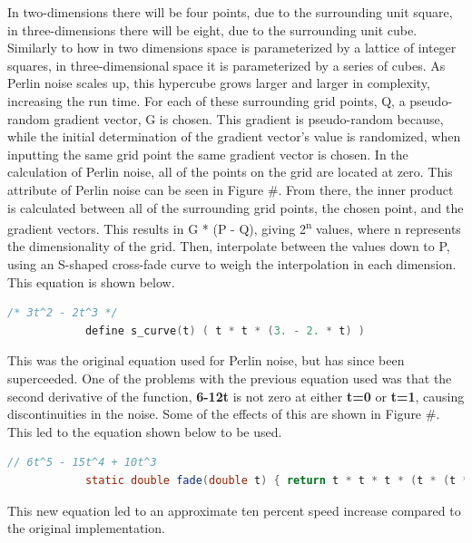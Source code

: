 \documentclass[10pt]{report}
\begin{document}
		In two-dimensions there will be four points, due to the surrounding unit square, in three-dimensions there will be eight, due to the surrounding unit cube. Similarly to how in two dimensions space is parameterized by a lattice of integer squares, in three-dimensional space it is parameterized by a series of cubes. As Perlin noise scales up, this hypercube grows larger and larger in complexity, increasing the run time. For each of these surrounding grid points, Q, a pseudo-random gradient vector, G is chosen. This gradient is pseudo-random because, while the initial determination of the gradient vector's value is randomized, when inputting the same grid point the same gradient vector is chosen. In the calculation of Perlin noise, all of the points on the grid are located at zero. This attribute of Perlin noise can be seen in Figure \#. From there, the inner product is calculated between all of the surrounding grid points, the chosen point, and the gradient vectors. This results in G * (P - Q), giving 2\textsuperscript{n} values, where n represents the dimensionality of the grid. Then, interpolate between the values down to P, using an S-shaped cross-fade curve to weigh the interpolation in each dimension. This equation is shown below.
		
		\begin{lstlisting}[language=C]
			/* 3t^2 - 2t^3 */
			define s_curve(t) ( t * t * (3. - 2. * t) )
		\end{lstlisting}
	
		This was the original equation used for Perlin noise, but has since been superceeded. One of the problems with the previous equation used was that the second derivative of the function, \textbf{6-12t} is not zero at either \textbf{t=0} or \textbf{t=1}, causing discontinuities in the noise. Some of the effects of this are shown in Figure \#. This led to the equation shown below to be used. 
		
		\begin{lstlisting}[language=Java]
			// 6t^5 - 15t^4 + 10t^3
			static double fade(double t) { return t * t * t * (t * (t * 6 - 15) + 10); }
		\end{lstlisting}
	
		This new equation led to an approximate ten percent speed increase compared to the original implementation. 
		
\end{document}

